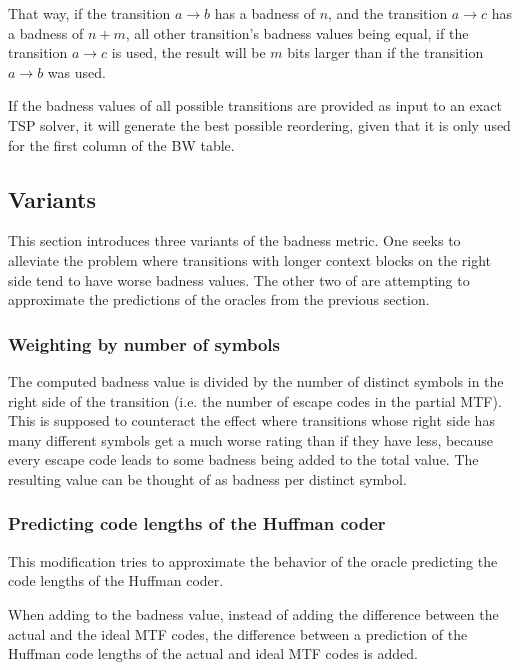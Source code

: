 \documentclass[a4paper]{scrreprt}
\begin{document}
That way, if the transition \(a \rightarrow b\) has a badness of \(n\), and the
transition \(a \rightarrow c\) has a badness of \(n + m\), all other
transition's badness values being equal, if the transition \(a \rightarrow c\)
is used, the result will be \(m\) bits larger than if the transition \(a
\rightarrow b\) was used.

If the badness values of all possible transitions are provided as input to an
exact TSP solver, it will generate the best possible reordering, given that it
is only used for the first column of the BW table.

\subsection{Variants}

This section introduces three variants of the badness metric. One seeks to
alleviate the problem where transitions with longer context blocks on the right
side tend to have worse badness values. The other two of are attempting to
approximate the predictions of the oracles from the previous section.

\subsubsection{Weighting by number of symbols}

The computed badness value is divided by the number of distinct symbols in the
right side of the transition (i.e. the number of escape codes in the partial
MTF). This is supposed to counteract the effect where transitions whose right
side has many different symbols get a much worse rating than if they have less,
because every escape code leads to some badness being added to the total value.
The resulting value can be thought of as badness per distinct symbol.

\subsubsection{Predicting code lengths of the Huffman coder}

This modification tries to approximate the behavior of the oracle predicting the
code lengths of the Huffman coder.

When adding to the badness value, instead of adding the difference between the
actual and the ideal MTF codes, the difference between a prediction of the
Huffman code lengths of the actual and ideal MTF codes is added.
\end{document}
